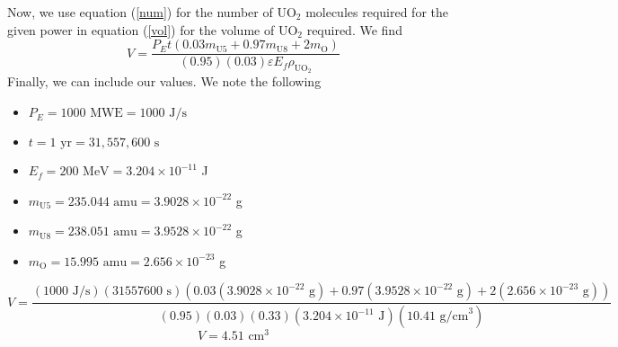 Now, we use equation (\ref{num}) for the number of UO$_2$ molecules required for the given power in equation (\ref{vol}) for the volume of UO$_2$ required. We find
$$ V = \frac{P_E t(0.03m_{\text{U5}} + 0.97m_{\text{U8}} + 2 m_{\text{O}})}{(0.95)(0.03)\varepsilon E_f\rho_{\text{UO}_2}} $$
Finally, we can include our values. We note the following
\begin{itemize}
\item $P_E = 1000\text{ MWE} = 1000\text{ J/s}$
\item $t = 1\text{ yr} = 31,557,600\text{ s}$
\item $E_f = 200\text{ MeV} = 3.204 \times 10^{-11}$ J
\item $m_{\text{U5}} = 235.044\text{ amu} = 3.9028 \times 10^{-22}$ g
\item $m_{\text{U8}} = 238.051\text{ amu} = 3.9528 \times 10^{-22}$ g
\item $m_{\text{O}} = 15.995\text{ amu} = 2.656 \times 10^{-23}$ g
\end{itemize}
$$ V = \frac{(1000\text{ J/s})(31557600\text{ s})(0.03(3.9028 \times 10^{-22}\text{ g}) + 0.97(3.9528 \times 10^{-22}\text{ g}) + 2(2.656 \times 10^{-23}\text{ g}))}{(0.95)(0.03)(0.33)(3.204 \times 10^{-11}\text{ J})(10.41\text{ g/cm}^3)} $$
$$\boxed{ V = 4.51\text{ cm}^3 }$$

